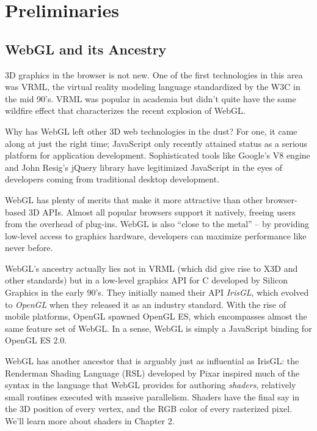 \chapter{Preliminaries}

\section{WebGL and its Ancestry}

3D graphics in the browser is not new.  One of the first technologies in this area was  VRML, the virtual reality modeling language standardized by the W3C in the mid 90's.  VRML was popular in academia but didn't quite have the same wildfire effect that characterizes the recent explosion of WebGL.

Why has WebGL left other 3D web technologies in the dust?  For one, it came along at just the right time; JavaScript only recently attained status as a serious platform for application development.  Sophisticated tools like Google's V8  engine  and John Resig's jQuery  library have legitimized JavaScript in the eyes of developers coming from traditional desktop development.

WebGL has plenty of merits that make it more attractive than other browser-based 3D APIs.  Almost all popular browsers support it natively, freeing users from the overhead of plug-ins.  WebGL is also ``close to the metal'' -- by providing low-level access to graphics hardware, developers can maximize performance like never before.

WebGL's ancestry actually lies not in VRML (which did give rise to X3D and other standards) but in a low-level graphics API for C developed by Silicon Graphics in the early 90's.  They initially named their API \emph{IrisGL}, which evolved to \emph{OpenGL} when they released it as an industry standard.   With the rise of mobile platforms, OpenGL spawned OpenGL ES, which encompasses almost the same feature set of WebGL.  In a sense, WebGL is simply a JavaScript binding for OpenGL ES 2.0.

WebGL has another ancestor that is arguably just as influential as IrisGL: the Renderman Shading Language (RSL) developed by Pixar inspired much of the syntax in the language that WebGL provides for authoring  \emph{shaders}, relatively small routines executed with massive parallelism.  Shaders have the final say in the 3D position of every vertex, and the RGB color of every rasterized pixel.  We'll learn more about shaders in Chapter 2.

